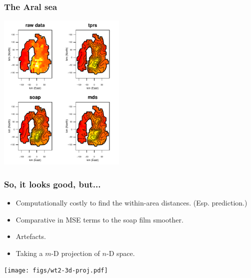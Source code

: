 \documentclass[ignorenonframetext]{beamer} %
\newcommand{\bi}{\begin{itemize}}
\newcommand{\ei}{\end{itemize}}
\begin{document}

\begin{frame}
	\frametitle{The Aral sea}
            \centering
              \includegraphics[height=3in]{figs/aral-fit.pdf}\\
\end{frame}

\begin{frame}
	\frametitle{So, it looks good, but...}
          \bi
            \item Computationally costly to find the within-area distances. (Esp. prediction.)
            \item Comparative in MSE terms to the soap film smoother.
            \item Artefacts.
            \item Taking a $m$-D projection of $n$-D space.
           \ei
            \centering
              \texttt{[image: figs/wt2-3d-proj.pdf]}\\           
\end{frame}
\end{document}
